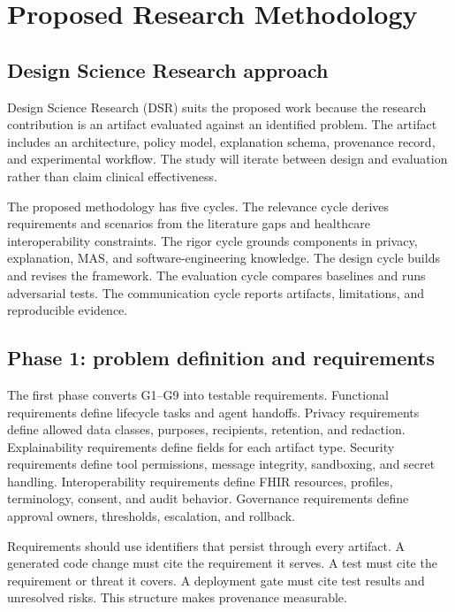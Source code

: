 \documentclass[11pt,a4paper]{article}
\begin{document}
\section{Proposed Research Methodology}

\subsection{Design Science Research approach}

Design Science Research (DSR) suits the proposed work because the research contribution is an artifact evaluated against an identified problem. The artifact includes an architecture, policy model, explanation schema, provenance record, and experimental workflow. The study will iterate between design and evaluation rather than claim clinical effectiveness.

The proposed methodology has five cycles. The relevance cycle derives requirements and scenarios from the literature gaps and healthcare interoperability constraints. The rigor cycle grounds components in privacy, explanation, MAS, and software-engineering knowledge. The design cycle builds and revises the framework. The evaluation cycle compares baselines and runs adversarial tests. The communication cycle reports artifacts, limitations, and reproducible evidence.

\subsection{Phase 1: problem definition and requirements}

The first phase converts G1--G9 into testable requirements. Functional requirements define lifecycle tasks and agent handoffs. Privacy requirements define allowed data classes, purposes, recipients, retention, and redaction. Explainability requirements define fields for each artifact type. Security requirements define tool permissions, message integrity, sandboxing, and secret handling. Interoperability requirements define FHIR resources, profiles, terminology, consent, and audit behavior. Governance requirements define approval owners, thresholds, escalation, and rollback.

Requirements should use identifiers that persist through every artifact. A generated code change must cite the requirement it serves. A test must cite the requirement or threat it covers. A deployment gate must cite test results and unresolved risks. This structure makes provenance measurable.
\end{document}
